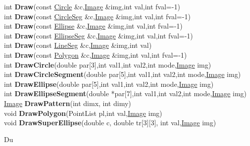 \documentclass[10pt,titlepage]{article}
\def\functionlistentry#1#2#3#4#5#6{\noindent #1 {\bf #2}(#3) \dotfill #6\\}
\def\letterref#1{}
\def\letterlabel#1{\vspace{0.5cm}\centerline{\Large #1}}
\def\letterlabelend#1{}
\begin{document}
{{\letterref{De}
\letterref{Di}
\letterref{Do}
\letterref{Dr}
\letterref{Du}
\letterlabelend{Dr}
\functionlistentry{int}{Draw}{const \hyperlink{Circle}{Circle} \&c,\hyperlink{Image}{Image} \&img,int val,int fval=-1}{623}{geoObject}{}
\functionlistentry{int}{Draw}{const \hyperlink{CircleSeg}{CircleSeg} \&c,\hyperlink{Image}{Image} \&img,int val,int fval=-1}{624}{geoObject}{}
\functionlistentry{int}{Draw}{const \hyperlink{Ellipse}{Ellipse} \&c,\hyperlink{Image}{Image} \&img,int val,int fval=-1}{625}{geoObject}{}
\functionlistentry{int}{Draw}{const \hyperlink{EllipseSeg}{EllipseSeg} \&c,\hyperlink{Image}{Image} \&img,int val,int fval=-1}{626}{geoObject}{}
\functionlistentry{int}{Draw}{const \hyperlink{LineSeg}{LineSeg} \&c,\hyperlink{Image}{Image} \&img,int val}{627}{geoObject}{}
\functionlistentry{int}{Draw}{const \hyperlink{Polygon}{Polygon} \&c,\hyperlink{Image}{Image} \&img,int val,int fval=-1}{628}{geoObject}{}
\functionlistentry{int}{DrawCircle}{double par[3],int val1,int val2,int mode,\hyperlink{Image}{Image} img}{1325}{graphics}{}
\functionlistentry{int}{DrawCircleSegment}{double par[5],int val1,int val2,int mode,\hyperlink{Image}{Image} img}{1328}{graphics}{}
\functionlistentry{int}{DrawEllipse}{double par[5],int val1,int val2,int mode,\hyperlink{Image}{Image} img}{1326}{graphics}{}
\functionlistentry{int}{DrawEllipseSegment}{double *par[7],int val1,int val2,int mode,\hyperlink{Image}{Image} img}{1329}{graphics}{}
\functionlistentry{\hyperlink{Image}{Image}}{DrawPattern}{int dimx, int dimy}{801}{cameraModel}{}
\functionlistentry{void}{DrawPolygon}{PointList pl,int val,\hyperlink{Image}{Image} img}{1330}{graphics}{}
\functionlistentry{void}{DrawSuperEllipse}{double c, double tr[3][3], int val,\hyperlink{Image}{Image} img}{1327}{graphics}{}

\letterlabel{Du}
\letterref{A}
\letterref{B}
\letterref{C}
\letterref{D}
\letterref{E}
\letterref{F}
\letterref{G}
\letterref{H}
\letterref{I}
\letterref{K}
\letterref{L}
\letterref{M}
\letterref{N}
\letterref{O}
\letterref{P}
\letterref{Q}
\letterref{R}
\letterref{S}
\letterref{T}
\letterref{U}
\letterref{V}
\letterref{W}
\letterref{X}
\letterref{Y}
\letterref{Z}

}}
\end{document}
